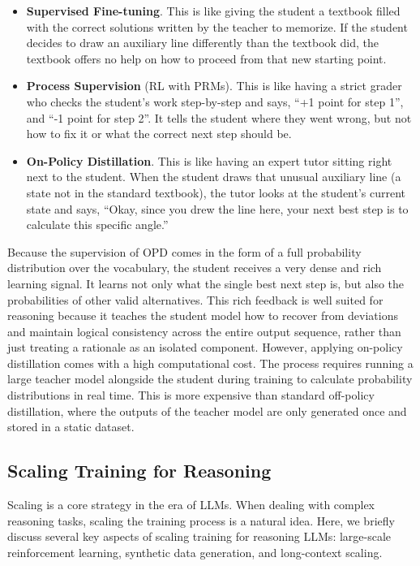\begin{itemize}
\item \vspace{0.5em} \textbf{Supervised Fine-tuning}. This is like giving the student a textbook filled with the correct solutions written by the teacher to memorize. If the student decides to draw an auxiliary line differently than the textbook did, the textbook offers no help on how to proceed from that new starting point.
\item \vspace{0.5em} \textbf{Process Supervision} (RL with PRMs). This is like having a strict grader who checks the student's work step-by-step and says, ``+1 point for step 1'', and ``-1 point for step 2''. It tells the student where they went wrong, but not how to fix it or what the correct next step should be.
\item \textbf{On-Policy Distillation}. This is like having an expert tutor sitting right next to the student. When the student draws that unusual auxiliary line (a state not in the standard textbook), the tutor looks at the student's current state and says, ``Okay, since you drew the line here, your next best step is to calculate this specific angle.''
\end{itemize}

Because the supervision of OPD comes in the form of a full probability distribution over the vocabulary, the student receives a very dense and rich learning signal. It learns not only what the single best next step is, but also the probabilities of other valid alternatives. This rich feedback is well suited for reasoning because it teaches the student model how to recover from deviations and maintain logical consistency across the entire output sequence, rather than just treating a rationale as an isolated component. However, applying on-policy distillation comes with a high computational cost. The process requires running a large teacher model alongside the student during training to calculate probability distributions in real time. This is more expensive than standard off-policy distillation, where the outputs of the teacher model are only generated once and stored in a static dataset.

\subsection{Scaling Training for Reasoning}

Scaling is a core strategy in the era of LLMs. When dealing with complex reasoning tasks, scaling the training process is a natural idea. Here, we briefly discuss several key aspects of scaling training for reasoning LLMs: large-scale reinforcement learning, synthetic data generation, and long-context scaling.

